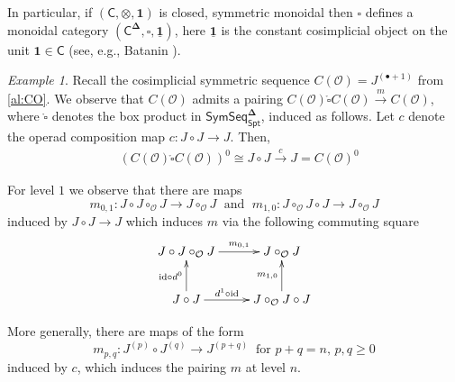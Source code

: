 \documentclass[11pt]{amsart}
\theoremstyle{definition}
\theoremstyle{remark}
\newtheorem{example}[subsection]{Example}
\newcommand{\Spt}{\mathsf{Spt}}
\newcommand{\SymSeq}{\mathsf{SymSeq}}
\newcommand{\id}{\mathrm{id}}
\newcommand{\Id}{\mathtt{Id}}
\newcommand{\Cal}[1]{\mathcal{#1}}
\newcommand{\boxcirc}{\mathring{\square}}
\newcommand{\bdel}{\mathbf{\Delta}}
\begin{document}
In particular, if $(\mathsf{C},\otimes, \mathbf{1})$ is closed, symmetric monoidal then $\square$ defines a monoidal category $(\textsf{C}^{\bdel}, \square, \underline{\mathbf{1}})$, here $\underline{\mathbf{1}}$ is the constant cosimplicial object on the unit $\mathbf{1}\in\mathsf{C}$ (see, e.g.,  Batanin \cite{Bat-box}). %

\begin{example} \label{ex:C(O)-box}
Recall the cosimplicial symmetric sequence $C(\Cal{O})=J^{(\bullet+1)}$ from \eqref{al:CO}. We observe that $C(\Cal{O})$ admits a pairing $C(\Cal{O}) \boxcirc C(\Cal{O}) \xrightarrow{m} C(\Cal{O})$, where $\boxcirc$ denotes the box product in $\SymSeq^{\bdel}_{\Spt}$, induced as follows. Let $c$ denote the operad composition map $c\colon J\circ J\to J$. Then, \begin{align*} 
    &(C(\Cal{O}) \boxcirc C(\Cal{O}))^0\cong J \circ J \xrightarrow{c} J=C(\Cal{O})^0 \end{align*}
    
For level $1$ we observe that there are maps \[ m_{0,1} \colon J\circ J\circ_{\Cal{O}} J \to J\circ_{\Cal{O}} J \; \text{ and } \; m_{1,0} \colon J \circ_{\Cal{O}} J \circ J \to J\circ_{\Cal{O}} J \]
induced by $J\circ J\to J$ which induces $m$ via the following commuting square
\begin{equation}\xymatrix{
    J \circ J\circ_{\Cal{O}} J \ar[r]^-{m_{0,1}}
    & 
    J \circ_{\Cal{O}} J 
    \\
    J \circ J \ar[u]^-{\id\circ  d^0} \ar[r]^-{d^1\circ \id}
    &
    J\circ_{\Cal{O}} J\circ J \ar[u]^-{m_{1,0}}
} 
\end{equation}

More generally, there are maps of the form \[m_{p,q}\colon J^{(p)} \circ J^{(q)} \to J^{(p+q)} \;\; \text{for $p+q=n$, $p,q\geq 0$}\] induced by $c$, which induces the pairing $m$ at level $n$. 
\end{example}
\end{document}
